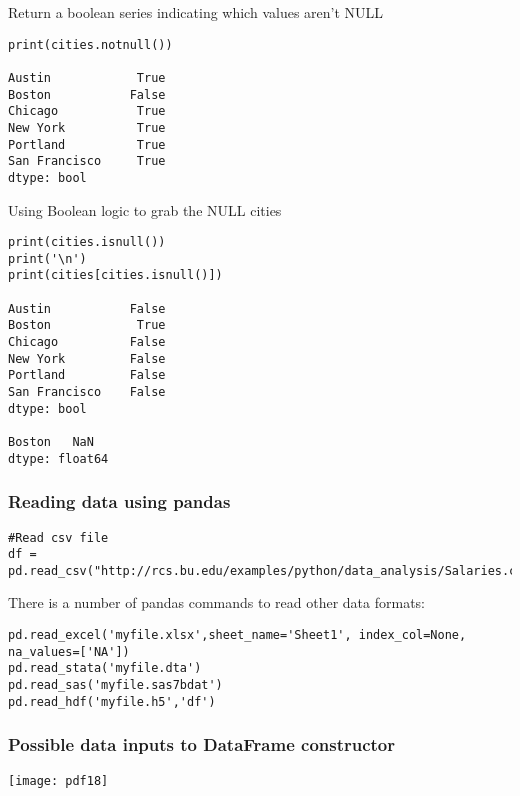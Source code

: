 \begin{frame}[fragile]
Return a boolean series indicating which values aren't NULL
\begin{lstlisting}
print(cities.notnull())

Austin            True
Boston           False
Chicago           True
New York          True
Portland          True
San Francisco     True
dtype: bool
\end{lstlisting}
\end{frame}

\begin{frame}[fragile]
Using Boolean logic to grab the NULL cities
\begin{lstlisting}
print(cities.isnull())
print('\n')
print(cities[cities.isnull()])

Austin           False
Boston            True
Chicago          False
New York         False
Portland         False
San Francisco    False
dtype: bool
			
Boston   NaN
dtype: float64
\end{lstlisting}
\end{frame}

\begin{frame}[fragile]
\frametitle{Reading data using pandas}

\begin{lstlisting}
#Read csv file
df = pd.read_csv("http://rcs.bu.edu/examples/python/data_analysis/Salaries.csv")

\end{lstlisting}
There is a number of pandas commands to read other data formats:
\begin{lstlisting}
pd.read_excel('myfile.xlsx',sheet_name='Sheet1', index_col=None, na_values=['NA'])
pd.read_stata('myfile.dta')
pd.read_sas('myfile.sas7bdat')
pd.read_hdf('myfile.h5','df')
\end{lstlisting}
\end{frame}

\begin{frame}[fragile]
\frametitle{Possible data inputs to DataFrame constructor}
\begin{center}
\texttt{[image: pdf18]}
\end{center}
\end{frame}


